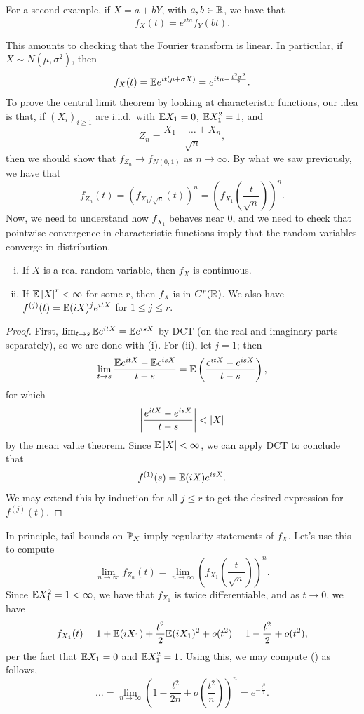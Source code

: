 For a second example, if $X = a + bY$, with $a, b \in \mathbb R$, we have that
\[ f_X(t) = e^{it a} f_Y(bt). \]

\newpage
This amounts to checking that the Fourier transform is linear. In particular, if $X \sim N(\mu, \sigma^2)$, then
\[ f_X(t) =\mathbb E e^{it(\mu + \sigma X)} = e^{it \mu - \frac{t^2 \sigma^2}{2}}. \]
To prove the central limit theorem by looking at characteristic functions, our idea is that, if $(X_i)_{i \geq 1}$ are i.i.d.\ with $\mathbb E X_1 = 0$, $\mathbb E X_1^2 = 1$, and
\[ Z_n = \frac{X_1 + \dots + X_n}{\sqrt n}, \]
then we should show that $f_{Z_n} \to f_{N(0, 1)}$ as $n \to \infty$. By what we saw previously, we have that
\[ f_{Z_n}(t) = \left(f_{X_1 / \sqrt{n}}(t)\right)^n = \left(f_{X_1}\left(\frac{t}{\sqrt n}\right)\right)^n. \]
Now, we need to understand how $f_{X_1}$ behaves near $0$, and we need to check that pointwise convergence in characteristic functions imply that the random variables converge in distribution.

\begin{lemma}[Panchenko \S3.5] \label{lem:characteristic_function_C^r}
    \begin{enumerate}[(i)]
        \item If $X$ is a real random variable, then $f_X$ is continuous.
        \item If $\mathbb E \left\lvert X \right\rvert^r < \infty$ for some $r$, then $f_X$ is in $C^r(\mathbb R)$. We also have $f^{(j)}(t) = \mathbb E (iX)^j e^{it X}$ for $1 \leq j \leq r$.
    \end{enumerate}
\end{lemma}
\begin{proof}
    First, $\lim_{t \to s} \mathbb E e^{it X} = \mathbb E e^{is X}$ by DCT (on the real and imaginary parts separately), so we are done with (i). For (ii), let $j = 1$; then
    \[ \lim_{t \to s} \frac{\mathbb E e^{itX} - \mathbb E e^{isX}}{t - s} = \mathbb E \left(\frac{e^{it X} - e^{is X}}{t - s}\right), \]
    for which 
    \[ \left\lvert \frac{e^{it X} - e^{is X}}{t - s} \right\rvert < \left\lvert X \right\rvert \]
    by the mean value theorem. Since $\mathbb E \left\lvert X \right\rvert < \infty$, we can apply DCT to conclude that
    \[ f^{(1)}(s) = \mathbb E (iX) e^{is X}. \]
    We may extend this by induction for all $j \leq r$ to get the desired expression for $f^{(j)}(t)$.
\end{proof}

In principle, tail bounds on $\mathbb P_X$ imply regularity statements of $f_X$. Let's use this to compute
\[ \lim_{n \to \infty} f_{Z_n}(t) = \lim_{n \to \infty} \left(f_{X_1}\left(\frac{t}{\sqrt{n}}\right)\right)^n. \tag{\textdagger} \]
Since $\mathbb E X_1^2 = 1 < \infty$, we have that $f_{X_1}$ is twice differentiable, and as $t \to 0$, we have
\[ f_{X_1}(t) = 1 + \mathbb E (iX_1) + \frac{t^2}{2} \mathbb E(iX_1)^2 + o(t^2) = 1 - \frac{t^2}{2} + o(t^2), \]
per the fact that $\mathbb E X_1 = 0$ and $\mathbb E X_1^2 = 1$. Using this, we may compute (\textdagger) as follows,
\[ \dots = \lim_{n \to \infty} \left(1 - \frac{t^2}{2n} + o\left(\frac{t^2}{n}\right)\right)^n = e^{-\frac{t^2}{2}}. \] 

